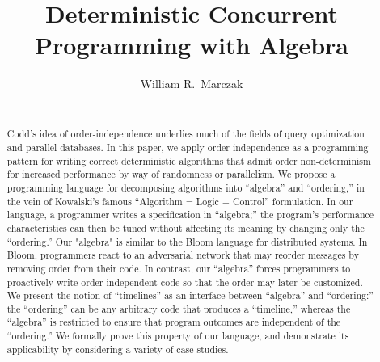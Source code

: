 \documentclass{sig-alternate}
\begin{document}
\title{Deterministic Concurrent Programming with Algebra}


%


\author{
\alignauthor William R.\ Marczak\\
\\
}

\toappear{}

\maketitle

\begin{abstract}
Codd's idea of order-independence underlies much of the fields of query
optimization and parallel databases.  In this paper, we apply
order-independence as a programming pattern for writing correct deterministic algorithms that admit order non-determinism for increased performance by way of randomness or parallelism.
We propose a programming language for decomposing algorithms
into ``algebra'' and ``ordering,'' in the vein of Kowalski's famous ``Algorithm
= Logic + Control'' formulation.  In our language, a programmer writes a
specification in ``algebra;'' the program's performance characteristics can
then be tuned without affecting its meaning by changing only the ``ordering.''
Our
"algebra" is similar to the Bloom language for distributed systems.  In
Bloom, programmers react to an adversarial network that may reorder
messages by removing order from their code.  In contrast, our ``algebra''
forces programmers to proactively write order-independent code so that the
order may later be customized.  We present the notion of ``timelines'' as an
interface between ``algebra'' and ``ordering:'' the ``ordering'' can be any
arbitrary code that produces a ``timeline,'' whereas the ``algebra'' is
restricted to ensure that program outcomes are independent of the
``ordering.''  We formally prove this property of our language, and
demonstrate its applicability by considering a variety of case studies.
\end{abstract}








%

\end{document}
